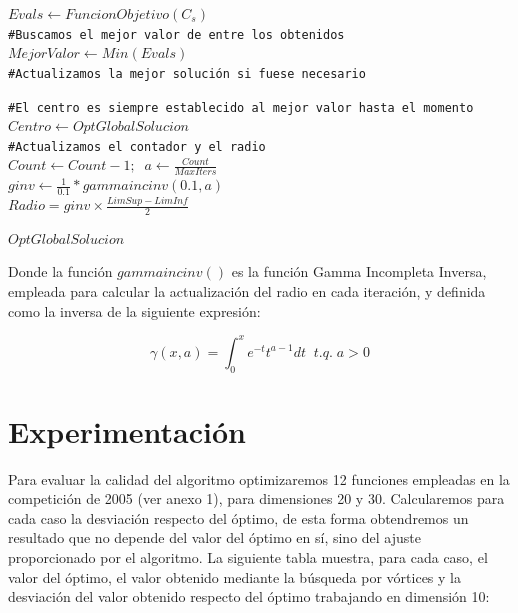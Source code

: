\documentclass[11pt,a4paper]{article}
\begin{document}
\begin{algorithm}
{{				$Evals \leftarrow FuncionObjetivo(C_s)$\\
				
				\texttt{\#Buscamos el mejor valor de entre los obtenidos}\\
				
				$MejorValor \leftarrow Min(Evals)$\\
				
				\texttt{\#Actualizamos la mejor solución si fuese necesario}\\
				
				
				\texttt{\#El centro es siempre establecido al mejor valor hasta el momento}\\
				
				$Centro \leftarrow OptGlobalSolucion$\\
				
				\texttt{\#Actualizamos el contador y el radio}\\
				
				$Count \leftarrow Count - 1; \;\; a \leftarrow \frac{Count}{MaxIters}$\\
				$ginv \leftarrow \frac{1}{0.1}*gammaincinv(0.1,a)$\\
				$Radio = ginv \times \frac{LimSup - LimInf}{2}$\\
				
			}
			
			\KwRet $OptGlobalSolucion$\\
		}
		
	\end{algorithm}	
	
	\noindent Donde la función $gammaincinv()$ es la función Gamma Incompleta Inversa, empleada para calcular la actualización del radio en cada iteración, y definida como la inversa de la siguiente expresión:
	
	$$ \gamma(x,a) = \int_{0}^{x} e^{-t}t^{a-1}dt \;\; t.q. \; a > 0$$
	
\section{Experimentación}

	\noindent Para evaluar la calidad del algoritmo optimizaremos 12 funciones empleadas en la competición de 2005 (ver anexo 1), para dimensiones 20 y 30. Calcularemos para cada caso la desviación respecto del óptimo, de esta forma obtendremos un resultado que no depende del valor del óptimo en sí, sino del ajuste proporcionado por el algoritmo. La siguiente tabla muestra, para cada caso, el valor del óptimo, el valor obtenido mediante la búsqueda por vórtices y la desviación del valor obtenido respecto del óptimo trabajando en dimensión 10:\\
	
\end{document}

